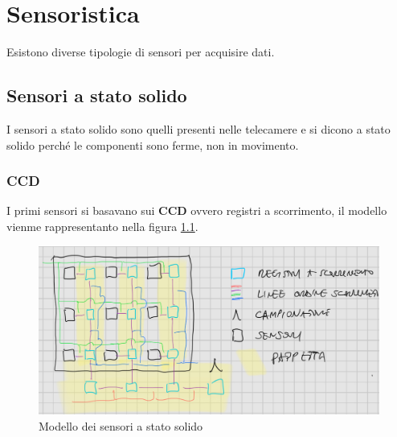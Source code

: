 \chapter{Sensoristica}
Esistono diverse tipologie di sensori per acquisire dati.

\section{Sensori a stato solido}
I sensori a stato solido sono quelli presenti nelle telecamere e si dicono a stato 
solido perché le componenti sono ferme, non in movimento. 

\subsection{CCD}
I primi sensori si basavano 
sui \textbf{CCD} ovvero registri a scorrimento, il modello vienme rappresentanto 
nella figura \ref{fig:modello_sensori_stato_solido}.

\begin{figure}[h]
    \centering
    \includegraphics[width=0.5 \textwidth]{figure/modello_sensori_solidi.jpg}
    \caption{Modello dei sensori a stato solido}
    \label{fig:modello_sensori_stato_solido}
\end{figure}

